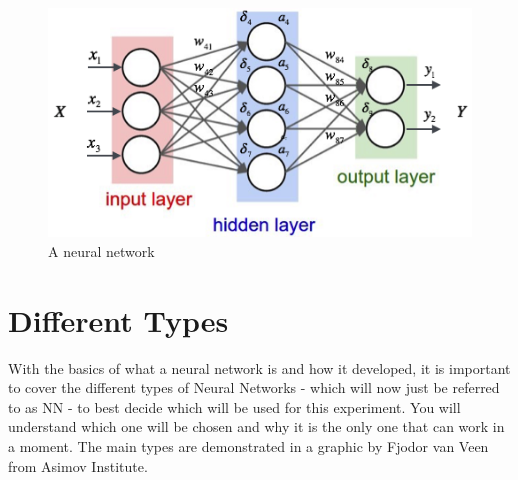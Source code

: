 \documentclass[12pt]{article}
\begin{document}
\begin{figure}[H]
  \includegraphics[width=\linewidth]{images/nn.png}
  \caption{A neural network}
\end{figure}

\section{Different Types}
\quad With the basics of what a neural network is and how it developed, it is important to cover the different types of Neural Networks - which will now just be referred to as NN - to best decide which will be used for this experiment. You will understand which one will be chosen and why it is the only one that can work in a moment. The main types are demonstrated in a graphic by Fjodor van Veen from Asimov Institute. 
\end{document}

